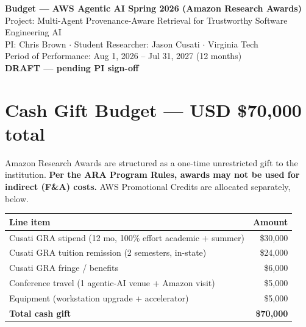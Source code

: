 \documentclass[11pt]{article}
\begin{document}
\thispagestyle{empty}

\begin{center}
\Large\textbf{Budget --- AWS Agentic AI Spring 2026 (Amazon Research Awards)} \\[2pt]
\normalsize Project: Multi-Agent Provenance-Aware Retrieval for Trustworthy Software Engineering AI \\
\normalsize PI: Chris Brown $\cdot$ Student Researcher: Jason Cusati $\cdot$ Virginia Tech \\
\normalsize Period of Performance: Aug 1, 2026 -- Jul 31, 2027 (12 months) \\
\textcolor{red!70!black}{\textbf{DRAFT --- pending PI sign-off}}
\end{center}

\vspace{0.4em}

\section*{Cash Gift Budget --- USD \$70,000 total}

Amazon Research Awards are structured as a one-time unrestricted gift to the institution. \textbf{Per the ARA Program Rules, awards may not be used for indirect (F\&A) costs.} AWS Promotional Credits are allocated separately, below.

\vspace{-0.3em}

\begin{table}[h]
\centering
\small
\begin{tabular}{p{3.2in} r}
\toprule
\textbf{Line item} & \textbf{Amount} \\
\midrule
Cusati GRA stipend (12 mo, 100\% effort academic + summer) & \$30,000 \\
Cusati GRA tuition remission (2 semesters, in-state) & \$24,000 \\
Cusati GRA fringe / benefits & \$6,000 \\
Conference travel (1 agentic-AI venue + Amazon visit) & \$5,000 \\
Equipment (workstation upgrade + accelerator) & \$5,000 \\
\midrule
\textbf{Total cash gift} & \textbf{\$70,000} \\
\bottomrule
\end{tabular}
\end{table}

\vspace{-0.4em}
\end{document}
